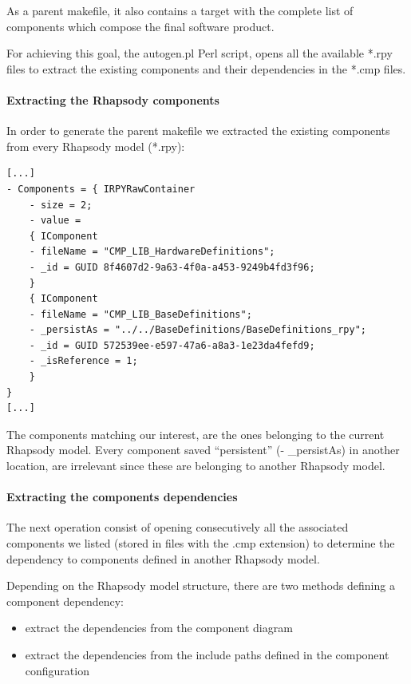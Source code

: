 \documentclass[dvips]{imsart}
\begin{document}
As a parent makefile, it also contains a target with the complete list of
components which compose the final software product.

For achieving this goal, the autogen.pl Perl script, opens all the available
*.rpy files to extract the existing components and their dependencies in the
*.cmp files.

\paragraph{Extracting the Rhapsody components} 
In order to generate the parent makefile we extracted the existing
components from every Rhapsody model (*.rpy): 

\lstset{frame=shadowbox, numbers=left, breaklines=true,
caption=HardwareDefinitions.rpy}
\begin{lstlisting}
[...]
- Components = { IRPYRawContainer
    - size = 2;
    - value =
    { IComponent
    - fileName = "CMP_LIB_HardwareDefinitions";
    - _id = GUID 8f4607d2-9a63-4f0a-a453-9249b4fd3f96;
    }
    { IComponent
    - fileName = "CMP_LIB_BaseDefinitions";
    - _persistAs = "../../BaseDefinitions/BaseDefinitions_rpy";
    - _id = GUID 572539ee-e597-47a6-a8a3-1e23da4fefd9;
    - _isReference = 1;
    }
}
[...]
\end{lstlisting}

The components matching our interest, are the ones belonging to the current
Rhapsody model. Every component saved ``persistent'' (- \_persistAs) in another
location, are irrelevant since these are belonging to another Rhapsody model.

\paragraph{Extracting the components dependencies}
The next operation consist of opening consecutively all the associated
components we listed (stored in files with the .cmp extension) to determine
the dependency to components defined  in another Rhapsody model.

Depending on the Rhapsody model structure, there are two methods defining
a component dependency:
\begin{itemize}
  \item extract the dependencies from the component diagram
  \item extract the dependencies from the include paths defined in the
  component configuration
\end{itemize}
\end{document}
